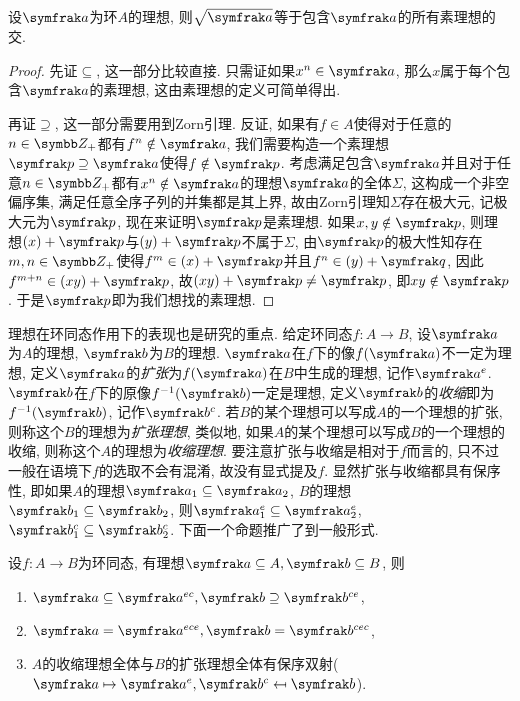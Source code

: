 \begin{proposition}\label{prop:scheinnullstellensatz}
    设$\ideal{a}$为环$A$的理想, 则$\sqrt{\ideal{a}}$等于包含$\ideal{a}$的所有素理想的交.
\end{proposition}

\begin{proof}
    先证$\subseteq$, 这一部分比较直接. 只需证如果$x^n\in\ideal{a}$, 那么$x$属于每个包含$\ideal{a}$的素理想, 这由素理想的定义可简单得出.

    再证$\supseteq$, 这一部分需要用到Zorn引理. 反证, 如果有$f\in A$使得对于任意的$n\in\ZZ_+$都有$f^n\notin\ideal{a}$, 我们需要构造一个素理想$\ideal{p}\supseteq\ideal{a}$使得$f\notin\ideal{p}$. 考虑满足包含$\ideal{a}$并且对于任意$n\in\ZZ_+$都有$x^n\notin\ideal{a}$的理想$\ideal{a}$的全体$\Sigma$, 这构成一个非空偏序集, 满足任意全序子列的并集都是其上界, 故由Zorn引理知$\Sigma$存在极大元, 记极大元为$\ideal{p}$, 现在来证明$\ideal{p}$是素理想. 如果$x, y\notin\ideal{p}$, 则理想$(x)+\ideal{p}$与$(y)+\ideal{p}$不属于$\Sigma$, 由$\ideal{p}$的极大性知存在$m, n\in\ZZ_+$使得$f^m\in (x)+\ideal{p}$并且$f^n\in (y)+\ideal{q}$, 因此$f^{m+n}\in (xy)+\ideal{p}$, 故$(xy)+\ideal{p}\neq\ideal{p}$, 即$xy\notin\ideal{p}$. 于是$\ideal{p}$即为我们想找的素理想.
\end{proof}

理想在环同态作用下的表现也是研究的重点. 给定环同态$f\colon A\to B$, 设$\ideal{a}$为$A$的理想, $\ideal{b}$为$B$的理想. $\ideal{a}$在$f$下的像$f(\ideal{a})$不一定为理想, 定义$\ideal{a}$的\emph{扩张}为$f(\ideal{a})$在$B$中生成的理想, 记作$\ideal{a}^e$. $\ideal{b}$在$f$下的原像$f^{-1}(\ideal{b})$一定是理想, 定义$\ideal{b}$的\emph{收缩}即为$f^{-1}(\ideal{b})$, 记作$\ideal{b}^c$. 若$B$的某个理想可以写成$A$的一个理想的扩张, 则称这个$B$的理想为\emph{扩张理想}, 类似地, 如果$A$的某个理想可以写成$B$的一个理想的收缩, 则称这个$A$的理想为\emph{收缩理想}. 要注意扩张与收缩是相对于$f$而言的, 只不过一般在语境下$f$的选取不会有混淆, 故没有显式提及$f$. 显然扩张与收缩都具有保序性, 即如果$A$的理想$\ideal{a}_1\subseteq\ideal{a}_2$, $B$的理想$\ideal{b}_1\subseteq\ideal{b}_2$, 则$\ideal{a}_1^e\subseteq\ideal{a}_2^e$, $\ideal{b}_1^c\subseteq\ideal{b}_2^c$. 下面一个命题推广了到一般形式.

\begin{proposition}\label{prop:extencontrcorr}
    设$f\colon A\to B$为环同态, 有理想$\ideal{a}\subseteq A, \ideal{b}\subseteq B$, 则
    \begin{enumerate}
        \item $\ideal{a}\subseteq\ideal{a}^{ec}, \ideal{b}\supseteq\ideal{b}^{ce}$,
        \item $\ideal{a}=\ideal{a}^{ece}, \ideal{b}=\ideal{b}^{cec}$,
        \item\label{enum:prop-ec-corr} $A$的收缩理想全体与$B$的扩张理想全体有保序双射($\ideal{a}\mapsto\ideal{a}^e, \ideal{b}^c\mapsfrom\ideal{b}$).
    \end{enumerate}
\end{proposition}

